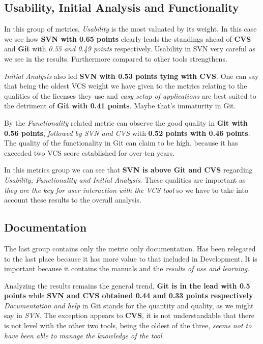 \documentclass[11pt]{scrartcl}
\begin{document}
\subsection{Usability, Initial Analysis and Functionality}\label{sec:compare-usa-ini-func}

\par In this group of metrics, \emph{Usability} is the most valuated by its weight. In this case we see how \textbf{SVN with 0.65 points} clearly leads the standings ahead of \textbf{CVS} and \textbf{Git} with \emph{0.55 and 0.49 points} respectively. Usability in SVN very careful as we see in the results. Furthermore compared to other tools strengthens.

\par \emph{Initial Analysis} also led \textbf{SVN with 0.53 points tying with CVS}. One can say that being the oldest VCS weight we have given to the metrics relating to the qualities of the licenses they use and \emph{easy setup of applications} are best suited to the detriment of \textbf{Git with 0.41 points}. Maybe that's immaturity in Git.

\par By the \emph{Functionality} related metric can observe the good quality in \textbf{Git with 0.56 points}, \emph{followed by SVN and CVS} with \textbf{0.52 points with 0.46 points}. The quality of the functionality in Git can claim to be high, because it has exceeded two VCS score established for over ten years.

\par In this metrics group we can see that \textbf{SVN is above Git and CVS} regarding \emph{Usability, Functionality and Initial Analysis}. These qualities are important as \emph{they are the key for user interaction with the VCS tool} so we have to take into account these results to the overall analysis.

\subsection{Documentation}\label{sec:compare-doc}

\par The last group contains only the metric only documentation. Has been relegated to the last place because it has more value to that included in Development. It is important because it contains the manuals and the \emph{results of use and learning}.

\par Analyzing the results remains the general trend, \textbf{Git is in the lead with 0.5 points} while \textbf{SVN and CVS obtained 0.44 and 0.33 points respectively}. \emph{Documentation and help} in Git stands for the quantity and quality, as we might say in \emph{SVN}. The exception appears to \textbf{CVS}, it is not understandable that there is not level with the other two tools, being the oldest of the three, \emph{seems not to have been able to manage the knowledge of the tool}.
\end{document}

